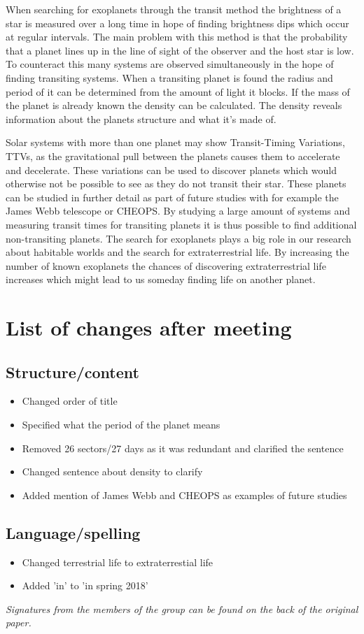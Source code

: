 \documentclass[titlepage]{article}
\begin{document}
	\vspace{0.5cm}\noindent When searching for exoplanets through the transit method the brightness of a star is measured over a long time in hope of finding brightness dips which occur at regular intervals. The main problem with this method is that the probability that a planet lines up in the line of sight of the observer and the host star is low. To counteract this many systems are observed simultaneously in the hope of finding transiting systems. When a transiting planet is found the radius and period of it can be determined from the amount of light it blocks. If the mass of the planet is already known the density can be calculated. The density reveals information about the planets structure and what it's made of. 
	
	\vspace{0.5cm}\noindent Solar systems with more than one planet may show Transit-Timing Variations, TTVs, as the gravitational pull between the planets causes them to accelerate and decelerate. These variations can be used to discover planets which would otherwise not be possible to see as they do not transit their star. These planets can be studied in further detail as part of future studies with for example the James Webb telescope or CHEOPS. By studying a large amount of systems and measuring transit times for transiting planets it is thus possible to find additional non-transiting planets. The search for exoplanets plays a big role in our research about habitable worlds and the search for extraterrestrial life. By increasing the number of known exoplanets the chances of discovering extraterrestrial life increases which might lead to us someday finding life on another planet. 
	
	\newpage
		\section*{List of changes after meeting}
	\subsection*{Structure/content}
	\begin{itemize}
		\item Changed order of title
		\item Specified what the period of the planet means
		\item Removed 26 sectors/27 days as it was redundant and clarified the sentence
		\item Changed sentence about density to clarify
		\item Added mention of James Webb and CHEOPS as examples of future studies
		
	\end{itemize}
	\subsection*{Language/spelling}
	\begin{itemize}
		\item Changed terrestrial life to extraterrestial life
		\item Added 'in' to 'in spring 2018'
	\end{itemize}
	
	\textit{Signatures from the members of the group can be found on the back of the original paper.}
	

	
	
\end{document}
